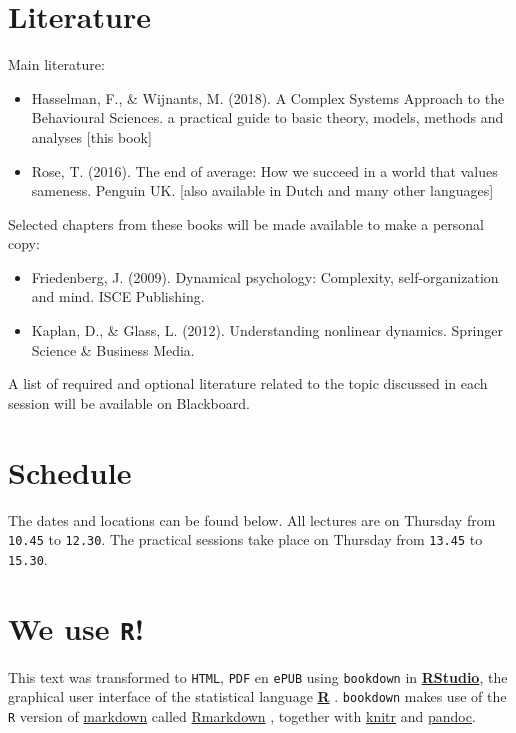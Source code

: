 \documentclass[12pt,]{book}
\providecommand{\tightlist}{%
  \setlength{\itemsep}{0pt}\setlength{\parskip}{0pt}}
\let\stdsection\section
\renewcommand\section{\newpage\stdsection}
\theoremstyle{definition}
\theoremstyle{definition}
\theoremstyle{definition}
\theoremstyle{remark}
\begin{document}
\section*{Literature}\label{literature}

Main literature:

\begin{itemize}
\tightlist
\item
  Hasselman, F., \& Wijnants, M. (2018). A Complex Systems Approach to
  the Behavioural Sciences. a practical guide to basic theory, models,
  methods and analyses {[}this book{]}
\item
  Rose, T. (2016). The end of average: How we succeed in a world that
  values sameness. Penguin UK. {[}also available in Dutch and many other
  languages{]}
\end{itemize}

Selected chapters from these books will be made available to make a
personal copy:

\begin{itemize}
\tightlist
\item
  Friedenberg, J. (2009). Dynamical psychology: Complexity,
  self-organization and mind. ISCE Publishing.
\item
  Kaplan, D., \& Glass, L. (2012). Understanding nonlinear dynamics.
  Springer Science \& Business Media.
\end{itemize}

A list of required and optional literature related to the topic
discussed in each session will be available on Blackboard.

\section{Schedule}\label{schedule}

The dates and locations can be found below. All lectures are on Thursday
from \texttt{10.45} to \texttt{12.30}. The practical sessions take place
on Thursday from \texttt{13.45} to \texttt{15.30}.

\section{\texorpdfstring{We use \texttt{R}!}{We use R!}}\label{we-use-r}

This text was transformed to \texttt{HTML}, \texttt{PDF} en
\texttt{ePUB} using \texttt{bookdown}\citep{R-bookdown} in
\href{https://www.rstudio.com}{\textbf{RStudio}}, the graphical user
interface of the statistical language
\href{https://www.r-project.org}{\textbf{R}} \citep{R-base}.
\texttt{bookdown} makes use of the \texttt{R} version of
\href{https://en.wikipedia.org/wiki/Markdown}{markdown} called
\href{http://rmarkdown.rstudio.com}{Rmarkdown} \citep{R-rmarkdown},
together with \href{http://yihui.name/knitr/}{knitr} \citep{R-knitr} and
\href{http://pandoc.org}{pandoc}.
\end{document}
